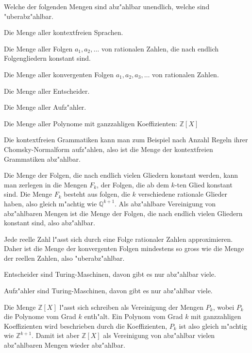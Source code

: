 Welche der folgenden Mengen sind abz"ahlbar unendlich, welche sind
"uberabz"ahlbar.
\begin{teilaufgaben}
\item Die Menge aller kontextfreien Sprachen.
\item Die Menge aller Folgen $a_1,a_2,\dots$ von rationalen Zahlen,
die nach endlich Folgengliedern konstant sind.
\item Die Menge aller konvergenten Folgen $a_1,a_2,a_3,\dots$ von
rationalen Zahlen.
\item Die Menge aller Entscheider.
\item Die Menge aller Aufz"ahler.
\item Die Menge aller Polynome mit ganzzahligen Koeffizienten:
${\mathbb Z}[X]$
\end{teilaufgaben}

\begin{loesung}
\begin{teilaufgaben}
\item Die kontextfreien Grammatiken kann man zum Beispiel nach
Anzahl Regeln ihrer Chomsky-Normalform aufz"ahlen, also ist
die Menge der kontextfreien Grammatiken abz"ahlbar.
\item Die Menge der Folgen, die nach endlich vielen Gliedern konstant
werden, kann man zerlegen in die Mengen $F_k$, der Folgen, die ab dem
$k$-ten Glied konstant sind. Die Menge $F_k$ besteht aus folgen, die
$k$ verschiedene rationale Glieder haben, also gleich m"achtig wie
$\mathbb Q^{k+1}$. Als abz"ahlbare Vereinigung von abz"ahlbaren Mengen
ist die Menge der Folgen, die nach endlich vielen Gliedern konstant sind,
also abz"ahlbar.
\item Jede reelle Zahl l"asst sich durch eine Folge rationaler Zahlen
approximieren. Daher ist die Menge der konvergenten Folgen mindestens
so gross wie die Menge der reellen Zahlen, also "uberabz"ahlbar.
\item Entscheider sind Turing-Maschinen, davon gibt es nur abz"ahlbar viele.
\item Aufz"ahler sind Turing-Maschinen, davon gibt es nur abz"ahlbar viele.
\item Die Menge ${\mathbb Z}[X]$ l"asst sich schreiben als Vereinigung
der Mengen $P_k$, wobei $P_k$ die Polynome vom Grad $k$ enth"alt.
Ein Polynom vom Grad $k$ mit ganzzahligen Koeffizienten wird beschrieben
durch die Koeffizienten, $P_k$ ist also gleich m"achtig wie $\mathbb Z^{k+1}$.
Damit ist aber ${\mathbb Z}[X]$ als Vereinigung von abz"ahlbar vielen
abz"ahlbaren Mengen wieder abz"ahlbar.
\end{teilaufgaben}
\end{loesung}
